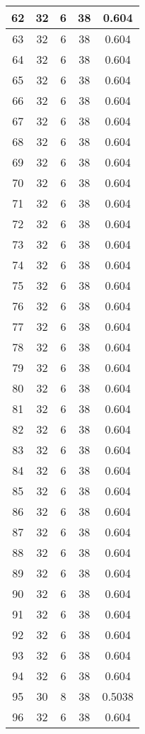 \documentclass[letterpaper, 12pt]{article}
\begin{document}
\begin{longtable}{|c|c|c|c|c|}
\hline
62 & 32 & 6 & 38 & 0.604 \\
\hline
63 & 32 & 6 & 38 & 0.604 \\
\hline
64 & 32 & 6 & 38 & 0.604 \\
\hline
65 & 32 & 6 & 38 & 0.604 \\
\hline
66 & 32 & 6 & 38 & 0.604 \\
\hline
67 & 32 & 6 & 38 & 0.604 \\
\hline
68 & 32 & 6 & 38 & 0.604 \\
\hline
69 & 32 & 6 & 38 & 0.604 \\
\hline
70 & 32 & 6 & 38 & 0.604 \\
\hline
71 & 32 & 6 & 38 & 0.604 \\
\hline
72 & 32 & 6 & 38 & 0.604 \\
\hline
73 & 32 & 6 & 38 & 0.604 \\
\hline
74 & 32 & 6 & 38 & 0.604 \\
\hline
75 & 32 & 6 & 38 & 0.604 \\
\hline
76 & 32 & 6 & 38 & 0.604 \\
\hline
77 & 32 & 6 & 38 & 0.604 \\
\hline
78 & 32 & 6 & 38 & 0.604 \\
\hline
79 & 32 & 6 & 38 & 0.604 \\
\hline
80 & 32 & 6 & 38 & 0.604 \\
\hline
81 & 32 & 6 & 38 & 0.604 \\
\hline
82 & 32 & 6 & 38 & 0.604 \\
\hline
83 & 32 & 6 & 38 & 0.604 \\
\hline
84 & 32 & 6 & 38 & 0.604 \\
\hline
85 & 32 & 6 & 38 & 0.604 \\
\hline
86 & 32 & 6 & 38 & 0.604 \\
\hline
87 & 32 & 6 & 38 & 0.604 \\
\hline
88 & 32 & 6 & 38 & 0.604 \\
\hline
89 & 32 & 6 & 38 & 0.604 \\
\hline
90 & 32 & 6 & 38 & 0.604 \\
\hline
91 & 32 & 6 & 38 & 0.604 \\
\hline
92 & 32 & 6 & 38 & 0.604 \\
\hline
93 & 32 & 6 & 38 & 0.604 \\
\hline
94 & 32 & 6 & 38 & 0.604 \\
\hline
95 & 30 & 8 & 38 & 0.5038 \\
\hline
96 & 32 & 6 & 38 & 0.604 \\

\end{longtable}
\end{document}
